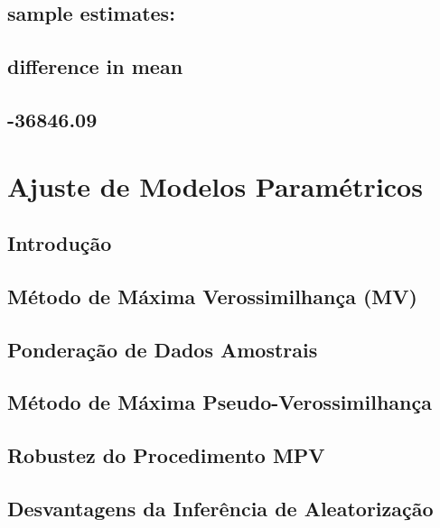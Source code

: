 \documentclass[]{book}
\theoremstyle{definition}
\theoremstyle{definition}
\theoremstyle{definition}
\theoremstyle{remark}
\begin{document}
\section{sample estimates:}\label{sample-estimates-1}

\section{difference in mean}\label{difference-in-mean-1}

\section{-36846.09}\label{section-41}

\chapter{Ajuste de Modelos Paramétricos}\label{ajmodpar}

\section{Introdução}\label{modpar1}

\section{Método de Máxima Verossimilhança
(MV)}\label{metodo-de-maxima-verossimilhanca-mv}

\section{Ponderação de Dados
Amostrais}\label{ponderacao-de-dados-amostrais}

\section{Método de Máxima Pseudo-Verossimilhança}\label{modpar3}

\section{Robustez do Procedimento
MPV}\label{robustez-do-procedimento-mpv}

\section{Desvantagens da Inferência de
Aleatorização}\label{desvantagens-da-inferencia-de-aleatorizacao}
\end{document}
